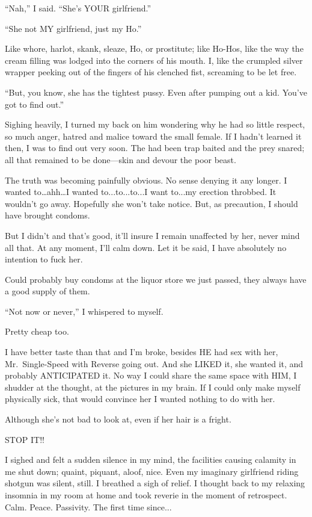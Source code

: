 \documentclass[
]{article}
\begin{document}
``Nah,'' I said. ``She's YOUR girlfriend.''

``She not MY girlfriend, just my Ho.''

Like whore, harlot, skank, sleaze, Ho, or prostitute; like Ho-Hos, like
the way the cream filling was lodged into the corners of his mouth. I,
like the crumpled silver wrapper peeking out of the fingers of his
clenched fist, screaming to be let free.

``But, you know, she has the tightest pussy. Even after pumping out a
kid. You've got to find out.''

Sighing heavily, I turned my back on him wondering why he had so little
respect, so much anger, hatred and malice toward the small female. If I
hadn't learned it then, I was to find out very soon. The had been trap
baited and the prey snared; all that remained to be done---skin and
devour the poor beast.

The truth was becoming painfully obvious. No sense denying it any
longer. I wanted to\ldots ahh\ldots I wanted to...to...to...I want
to...my erection throbbed. It wouldn't go away. Hopefully she won't take
notice. But, as precaution, I should have brought condoms.

But I didn't and that's good, it'll insure I remain unaffected by her,
never mind all that. At any moment, I'll calm down. Let it be said, I
have absolutely no intention to fuck her.

Could probably buy condoms at the liquor store we just passed, they
always have a good supply of them.

``Not now or never,'' I whispered to myself.

Pretty cheap too.

I have better taste than that and I'm broke, besides HE had sex with
her, Mr.~Single-Speed with Reverse going out. And she LIKED it, she
wanted it, and probably ANTICIPATED it. No way I could share the same
space with HIM, I shudder at the thought, at the pictures in my brain.
If I could only make myself physically sick, that would convince her I
wanted nothing to do with her.

Although she's not bad to look at, even if her hair is a fright.

STOP IT!!

I sighed and felt a sudden silence in my mind, the facilities causing
calamity in me shut down; quaint, piquant, aloof, nice. Even my
imaginary girlfriend riding shotgun was silent, still. I breathed a sigh
of relief. I thought back to my relaxing insomnia in my room at home and
took reverie in the moment of retrospect. Calm. Peace. Passivity. The
first time since...
\end{document}
